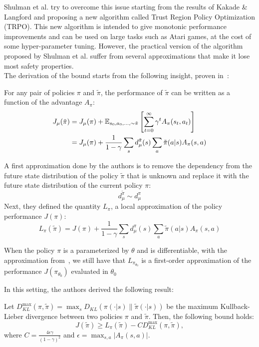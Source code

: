 Shulman et al. try to overcome this issue starting from the results of Kakade \& Langford and proposing a new algorithm called Trust Region Policy Optimization (TRPO). This new algorithm is intended to give monotonic performance improvements and can be used on large tasks such as Atari games, at the cost of some hyper-parameter tuning. However, the practical version of the algorithm proposed by Shulman et al. suffer from several approximations that make it lose most safety properties.\\
The derivation of the bound starts from the following insight, proven in~\cite{natural}:
\begin{lemma}
For any pair of policies $\pi$ and $\tilde{\pi}$, the performance of $\tilde{\pi}$ can be written as a function of the advantage $A_\pi$:
\begin{align*}
J_\mu(\tilde{\pi}) &= J_\mu(\pi) + \EV[s_0, a_0, \ldots,\sim\tilde{\pi}]{\sum_{t=0}^{\infty}\gamma^t A_\pi(s_t,a_t)} \\&= J_\mu(\pi) + \frac{1}{1-\gamma}\sum_s d_{\mu}^{\tilde{\pi}}(s)\sum_a \tilde{\pi}(a|s)A_\pi(s,a)
\end{align*}
\end{lemma}

A first approximation done by the authors is to remove the dependency from the future state distribution of the policy $\tilde{\pi}$ that is unknown and replace it with the future state distribution of the current policy $\pi$:
\begin{equation}
\label{eq:trpo-first-approx}
d_\mu^{\tilde{\pi}}\sim d_\mu^{\pi}
\end{equation}
Next, they defined the quantity $L_\pi$, a local approximation of the policy performance $J(\pi)$:
\[
L_\pi(\tilde{\pi}) = J(\pi) + \frac{1}{1-\gamma}\sum_s d_\mu^{\pi}(s) \sum_a \tilde{\pi}(a|s) A_\pi(s,a)
\]
\begin{note}
When the policy $\pi$ is a parameterized by $\theta$ and is differentiable, with the approximation from~, we still have that $L_{\pi_{\theta_0}}$ is a first-order approximation of the performance $J(\pi_{\theta_0})$ evaluated in $\theta_0$
\end{note}

In this setting, the authors derived the following result:
\begin{theorem}
\label{th:trpo-main}
Let $D_{KL}^{\max}(\pi, \tilde{\pi}) = \max_s D_{KL}(\pi(\cdot|s) \parallel \tilde{\pi}(\cdot|s))$ be the maximum Kullback-Lieber divergence between two policies $\pi$ and $\tilde{\pi}$. Then, the following bound holds:
\[
J(\tilde{\pi})\geq L_\pi(\tilde{\pi})-CD_{KL}^{\max}(\pi, \tilde{\pi}),
\]
where $C = \frac{4\epsilon\gamma}{(1-\gamma)^2}$ and $\epsilon = \max_{s,a}|A_\pi (s,a)|$.
\end{theorem}


